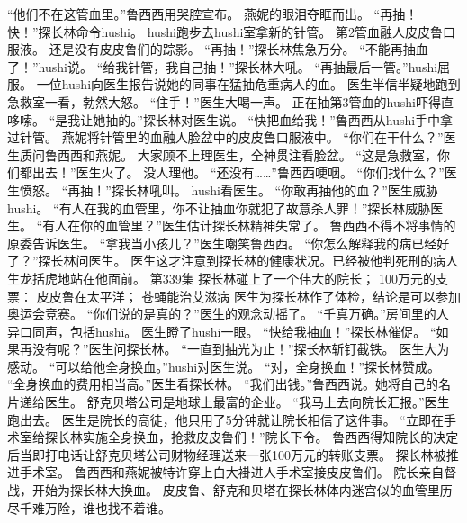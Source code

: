 \documentclass[a4paper,12pt,UTF8,twoside]{ctexbook}
\begin{document}
        “他们不在这管血里。”鲁西西用哭腔宣布。  
        燕妮的眼泪夺眶而出。  
        “再抽！快！”探长林命令hushi。  
        hushi跑步去hushi室拿新的针管。  
        第2管血融人皮皮鲁口服液。  
        还是没有皮皮鲁们的踪影。  
        “再抽！”探长林焦急万分。  
        “不能再抽血了！”hushi说。  
        “给我针管，我自己抽！”探长林大吼。  
        “再抽最后一管。”hushi屈服。  
        一位hushi向医生报告说她的同事在猛抽危重病人的血。  
        医生半信半疑地跑到急救室一看，勃然大怒。        
        “住手！”医生大喝一声。  
        正在抽第3管血的hushi吓得直哆嗦。  
        “是我让她抽的。”探长林对医生说。  
        “快把血给我！”鲁西西从hushi手中拿过针管。  
        燕妮将针管里的血融人脸盆中的皮皮鲁口服液中。  
        “你们在干什么？”医生质问鲁西西和燕妮。  
        大家顾不上理医生，全神贯注看脸盆。  
        “这是急救室，你们都出去！”医生火了。  
        没人理他。  
        “还没有……”鲁西西哽咽。  
        “你们找什么？”医生愤怒。  
        “再抽！”探长林吼叫。  
        hushi看医生。  
        “你敢再抽他的血？”医生威胁hushi。  
        “有人在我的血管里，你不让抽血你就犯了故意杀人罪！”探长林威胁医生。  
        “有人在你的血管里？”医生估计探长林精神失常了。  
        鲁西西不得不将事情的原委告诉医生。  
        “拿我当小孩儿？”医生嘲笑鲁西西。  
        “你怎么解释我的病已经好了？”探长林问医生。  
        医生这才注意到探长林的健康状况。已经被他判死刑的病人生龙括虎地站在他面前。          第339集  
        探长林碰上了一个伟大的院长；  
        100万元的支票：  
        皮皮鲁在太平洋；  
        苍蝇能治艾滋病    
        医生为探长林作了体检，结论是可以参加奥运会竞赛。  
        “你们说的是真的？”医生的观念动摇了。  
        “千真万确。”房间里的人异口同声，包括hushi。  
        医生瞪了hushi一眼。  
        “快给我抽血！”探长林催促。  
        “如果再没有呢？”医生问探长林。  
        “一直到抽光为止！”探长林斩钉截铁。  
        医生大为感动。  
        “可以给他全身换血。”hushi对医生说。  
        “对，全身换血！”探长林赞成。        
        “全身换血的费用相当高。”医生看探长林。  
        “我们出钱。”鲁西西说。她将自己的名片递给医生。  
        舒克贝塔公司是地球上最富的企业。  
        “我马上去向院长汇报。”医生跑出去。  
        医生是院长的高徒，他只用了5分钟就让院长相信了这件事。  
        “立即在手术室给探长林实施全身换血，抢救皮皮鲁们！”院长下令。  
        鲁西西得知院长的决定后当即打电话让舒克贝塔公司财物经理送来一张100万元的转账支票。  
        探长林被推进手术室。  
        鲁西西和燕妮被特许穿上白大褂进人手术室接皮皮鲁们。  
        院长亲自督战，开始为探长林大换血。  
        皮皮鲁、舒克和贝塔在探长林体内迷宫似的血管里历尽千难万险，谁也找不着谁。  
\end{document}
